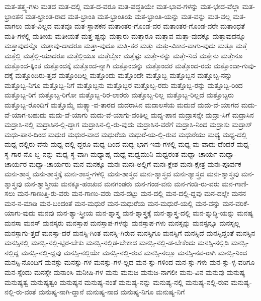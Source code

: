{ಮತ-ತತ್ತ್ವ-ಗಳು
ಮತದ
ಮತ-ದಲ್ಲಿ
ಮತ-ದ-ವರೂ
ಮತ-ಪದ್ಧತಿಯೇ
ಮತ-ಭಾವ-ಗಳನ್ನು
ಮತ-ಭೇದ-ವೆಲ್ಲಾ
ಮತ-ಭ್ರಾಂತನ
ಮತ-ಭ್ರಾಂತ-ರಾದ
ಮತ-ಭ್ರಾಂತಿ
ಮತ-ಭ್ರಾಂತಿಯ
ಮತ-ಭ್ರಾಂತಿ-ಯನ್ನು
ಮತ-ವನ್ನು
ಮತ-ವಲ್ಲ
ಮತ-ವಾಗಲು
ಮತ-ವಿಲ್ಲದ
ಮತವೂ
ಮತ-ಸ್ಥಾಪಕನ
ಮತಾಂತರ-ಗೊಂಡ-ವರ
ಮತಾಂತರ-ಗೊಂಡ-ವರೇ
ಮತಾಂಧತೆ
ಮತಿ-ಗಳಲ್ಲಿ
ಮತೀಯ
ಮತೀಯತೆ
ಮತ್ತ-ಷ್ಟನ್ನು
ಮತ್ತಾರು
ಮತ್ತಾರೂ
ಮತ್ತಾವ
ಮತ್ತಾ-ವುದಕ್ಕೂ
ಮತ್ತಾವುದನ್ನೂ
ಮತ್ತಾವುದನ್ನೊ
ಮತ್ತಾವು-ದಾದರೂ
ಮತ್ತಾ-ವುದೂ
ಮತ್ತಿ-ತರ
ಮತ್ತು
ಮತ್ತು-ವಿಕಾಸ-ವಾಗು-ವುದು
ಮತ್ತೂ
ಮತ್ತೆ
ಮತ್ತೆಲ್ಲಿ
ಮತ್ತೆಲ್ಲಿ-ಯಾದರೂ
ಮತ್ತೆಲ್ಲಿಯೂ
ಮತ್ತೆಲ್ಲೋ
ಮತ್ತೆಷ್ಟು
ಮತ್ತೇ-ನನ್ನು
ಮತ್ತೇ-ನಿದೆ
ಮತ್ತೇನು
ಮತ್ತೇನೂ
ಮತ್ತೊಂದ-ಕ್ಕಿಂತ
ಮತ್ತೊಂದಕ್ಕೆ
ಮತ್ತೊಂದ-ನ್ನಾಗಿ
ಮತ್ತೊಂದನ್ನು
ಮತ್ತೊಂದರ
ಮತ್ತೊಂದ-ರದು
ಮತ್ತೊಂದಾ-ಗುವು-ದಕ್ಕೆ
ಮತ್ತೊಂದಿರು-ತ್ತದೆ
ಮತ್ತೊಂದಿಲ್ಲ
ಮತ್ತೊಂದು
ಮತ್ತೊಂದೇ
ಮತ್ತೊಬ್ಬ
ಮತ್ತೊಬ್ಬನ
ಮತ್ತೊಬ್ಬ-ನನ್ನು
ಮತ್ತೊಬ್ಬ-ನಿಗೂ
ಮತ್ತೊಬ್ಬ-ನಿಗೆ
ಮತ್ತೊಬ್ಬನು
ಮತ್ತೊಬ್ಬರ
ಮತ್ತೊಬ್ಬ-ರದು
ಮತ್ತೊಬ್ಬ-ರನ್ನು
ಮತ್ತೊಬ್ಬ-ರಿಂದ
ಮತ್ತೊಬ್ಬ-ರಿಗೆ
ಮತ್ತೊಬ್ಬ-ರಿಗೋ
ಮತ್ತೊಬ್ಬ-ರಿರ-ಲಾರರು
ಮತ್ತೊಬ್ಬ-ರಿಲ್ಲ
ಮತ್ತೊಬ್ಬ-ರಿಲ್ಲದೆ
ಮತ್ತೊಬ್ಬರು
ಮತ್ತೊಬ್ಬ-ರೊಂದಿಗೆ
ಮತ್ತೊಮ್ಮೆ
ಮತ್ಸ್ಯಾ-ವ-ತಾರದ
ಮದರಾಸಿನ
ಮದಾಲಸೆಯ
ಮದುವೆ
ಮದು-ವೆ-ಯಾಗದ
ಮದು-ವೆ-ಯಾಗ-ಬಹುದು
ಮದು-ವೆ-ಯಾಗು
ಮದು-ವೆ-ಯಾಗು-ವಂತಿಲ್ಲ
ಮದ್ಯ-ಪಾನ
ಮದ್ರಾಸನ್ನೇ
ಮದ್ರಾ-ಸಿಗೆ
ಮದ್ರಾಸಿನ
ಮದ್ರಾಸಿ-ನಲ್ಲಿ
ಮದ್ರಾಸಿನ-ಲ್ಲಿ-ದ್ದಾಗ
ಮದ್ರಾಸಿನ-ಲ್ಲಿ-ರು-ವುದು
ಮದ್ರಾಸಿನ-ವರೆಗೆ
ಮದ್ರಾಸಿ-ನಿಂದ
ಮದ್ರಾಸು
ಮದ್ರಾಸ್
ಮಧು-ಪಾನ-ದಿಂದ
ಮಧುರ
ಮಧುರ-ವಾದ
ಮಧುರೆಯ
ಮಧುರೆ-ಯ-ಲ್ಲಿ-ರುವ
ಮಧುರೆಯು
ಮಧ್ಯ
ಮಧ್ಯ-ದಲ್ಲಿ
ಮಧ್ಯ-ದಲ್ಲಿರು-ವೆನು
ಮಧ್ಯ-ದಲ್ಲಿ-ದ್ದರೂ
ಮಧ್ಯ-ದಿಂದ
ಮಧ್ಯ-ಭಾಗ-ಇವು-ಗಳಲ್ಲಿ
ಮಧ್ಯ-ಮ-ವಾದು-ದೆಂದರೆ
ಮಧ್ಯ-ಸ್ಥ-ಗಾರ-ನೊ-ಬ್ಬ-ನನ್ನು
ಮಧ್ಯ-ಸ್ಥ-ವಾಗಿ
ಮಧ್ಯಾಹ್ನ
ಮಧ್ಯೆ
ಮಧ್ವಮುನಿ
ಮಧ್ವರಂತ
ಮಧ್ವಾ-ಚಾರ್ಯ
ಮಧ್ವಾ-ಚಾರ್ಯರ
ಮಧ್ವಾ-ಚಾರ್ಯರು
ಮನ
ಮನಕ್ಕೂ
ಮನಃ
ಮನಃ-ಅಲ್ಲಿಗೆ
ಮನಃ-ಕ್ಲೇಶ
ಮನಃ-ಕ್ಷೇತ್ರ
ಮನಃ-ಪೂರ್ವಕ
ಮನಃ-ಶಾಸ್ತ್ರ
ಮನಃ-ಶಾಸ್ತ್ರಕ್ಕೆ
ಮನಃ-ಶಾಸ್ತ್ರ-ಗಳಲ್ಲಿ
ಮನಃ-ಶಾಸ್ತ್ರದ
ಮನಃ-ಶ್ಶಾಸ್ತ್ರದ
ಮನಃ-ಶ್ಯಾಸ್ತ್ರದ
ಮನಃ-ಶ್ಶಾಸ್ತ್ರವು
ಮನ-ಶ್ಶಾಸ್ತ್ರವು
ಮನ-ಶ್ಶಾಸ್ತ್ರೀಯ
ಮನಕ್ಕೂ-ಹಂಚುವ
ಮನಗಂಡರು
ಮನ-ಗಂಡ-ವನು
ಮನ-ಗಂಡಿ-ರು-ವರು
ಮನ-ಗಾಣಿ-ಸಲು
ಮನ-ಗಾಣುತ್ತಿ-ರು-ವರು
ಮನ-ಗಾಣು-ವರು
ಮನ-ದಟ್ಟು
ಮನ-ದಲ್ಲಿ
ಮನ-ದಲ್ಲಿ-ದ್ದವು
ಮನ-ದಲ್ಲೇ
ಮನನ
ಮನ-ನ-ಮಾಡಿ
ಮನ-ಬಂದಂತೆ
ಮನ-ಮಧುರೆ
ಮನ-ಮಧುರೆಯ
ಮನ-ಮಧುರೆ-ಯಲ್ಲಿ
ಮನ-ವನ್ನು
ಮನ-ವರಿಕೆ-ಯಾಗು-ವುದು
ಮನವು
ಮನ-ಶ್ಯಾ-ಸ್ತ್ರೀಯ
ಮನ-ಶ್ಶಾಸ್ತ್ರ
ಮನ-ಶ್ಶಾಸ್ತ್ರಕ್ಕೆ
ಮನ-ಶ್ಶಾಸ್ತ್ರ-ದಲ್ಲಿ
ಮನ-ಶ್ಶುದ್ಧಿ-ಯನ್ನು
ಮನಷ್ಯ
ಮನಸಾ
ಮನಸ್
ಮನಸ್ಕರು
ಮನಸ್ತಾಪ
ಮನಸ್ತಾಪ-ಗಳನ್ನು
ಮನಸ್ತಾಪ-ಗಳು
ಮನಸ್ಸನ್ನು
ಮನಸ್ಸನ್ನೂ
ಮನಸ್ಸಲ್ಲ
ಮನಸ್ಸಾಗು-ತ್ತದೆ
ಮನಸ್ಸಾ-ದರೆ
ಮನಸ್ಸಿ-ಗಿಂತ
ಮನಸ್ಸಿ-ಗಿರುವ
ಮನಸ್ಸಿಗೂ
ಮನಸ್ಸಿಗೆ
ಮನಸ್ಸಿದೆ
ಮನಸ್ಸಿದ್ದಂತೆ
ಮನಸ್ಸಿನ
ಮನಸ್ಸಿನಲ್ಲಿ
ಮನಸ್ಸಿ-ನಲ್ಲಿ-ಟ್ಟಿರ-ಬೇಕು
ಮನಸ್ಸಿ-ನಲ್ಲಿಡ-ಬೇಕಾದ
ಮನಸ್ಸಿ-ನಲ್ಲಿ-ಡ-ಬೇಕೆಂದು
ಮನಸ್ಸಿ-ನಲ್ಲಿಡಿ
ಮನಸ್ಸಿ-ನಲ್ಲಿದ್ದ
ಮನಸ್ಸಿ-ನಲ್ಲಿ-ದ್ದವು
ಮನಸ್ಸಿ-ನಲ್ಲಿಯೇ
ಮನಸ್ಸಿ-ನಲ್ಲಿ-ರುವ
ಮನಸ್ಸಿ-ನಲ್ಲೂ
ಮನಸ್ಸಿ-ನವ-ರಾಗಿ
ಮನಸ್ಸಿ-ನಿಂದ
ಮನಸ್ಸಿ-ನೊಂದಿಗೆ
ಮನಸ್ಸು
ಮನಸ್ಸು-ಗಳ
ಮನಸ್ಸು-ಗಳ-ಲ್ಲದ
ಮನ-ಸ್ಸು-ಗಳಿಂದ
ಮನ-ಸ್ಸು-ಗಳು
ಮನ-ಸ್ಸು-ಳ್ಳ-ವರಿಗೂ
ಮನ-ಸ್ಸೆಂದು
ಮನಸ್ಸೇ
ಮನಾಂಸಿ
ಮನೀಷಿ-ಗಳ
ಮನು
ಮನುಜ
ಮನುಜ-ನಾಗಲೀ
ಮನು-ವಿನ
ಮನುವು
ಮನುಷ್ಯ
ಮನುಷ್ಯತ್ವ
ಮನುಷ್ಯತ್ವಂ
ಮನುಷ್ಯನ
ಮನುಷ್ಯ-ನಂತೆ
ಮನುಷ್ಯ-ನನ್ನು
ಮನುಷ್ಯ-ನಲ್ಲಿ
ಮನುಷ್ಯ-ನಲ್ಲಿ-ರುವ
ಮನುಷ್ಯ-ನಲ್ಲಿ-ರು-ವಂತೆ
ಮನುಷ್ಯ-ನಾಗಿ-ದ್ದಾನೆ
ಮನುಷ್ಯ-ನಾದ
ಮನುಷ್ಯ-ನಿಗೂ
ಮನುಷ್ಯ-ನಿಗೆ
}
